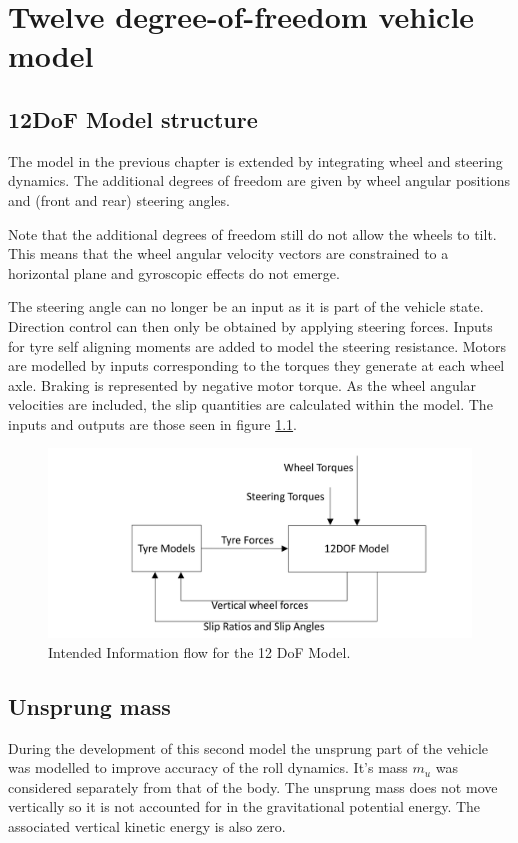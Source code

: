 \chapter{Twelve degree-of-freedom vehicle model}
\label{chap:12dof}
\section{12DoF Model structure}
\label{sec:12dofconcept}
The model in the previous chapter is extended by integrating wheel and steering dynamics.
The additional degrees of freedom are given by wheel angular positions and (front and rear) steering angles.

Note that the additional degrees of freedom still do not allow the wheels to tilt. This means that the wheel angular velocity vectors are constrained to a horizontal plane and gyroscopic effects do not emerge.

The steering angle can no longer be an input as it is part of the vehicle state. Direction control can then only be obtained by applying steering forces.
Inputs for tyre self aligning moments are added to model the steering resistance.
Motors are modelled by inputs corresponding to the torques they generate at each wheel axle. Braking is represented by negative motor torque.
As the wheel angular velocities are included, the slip quantities are calculated within the model. The inputs and outputs are those seen in figure \ref{12flow}.
\begin{figure}[ht]
  \centering
  \includegraphics[width=\textwidth]{images/12flow}
  \caption{Intended Information flow for the 12 DoF Model.}
  \label{12flow}
\end{figure}

\section{Unsprung mass}
\label{sec:umass}
During the development of this second model the unsprung part of the vehicle was modelled to improve accuracy of the roll dynamics. It's mass $m_u$ was considered separately from that of the body.
The unsprung mass does not move vertically so it is not accounted for in the gravitational potential energy. The associated vertical kinetic energy is also zero.

